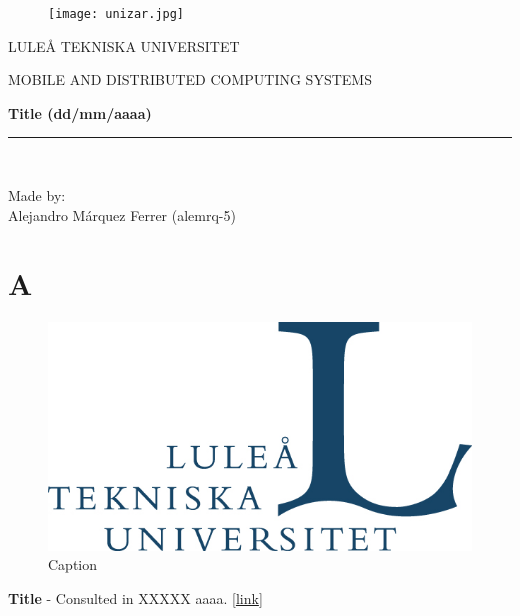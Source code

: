 \documentclass[a4paper]{article}
\begin{document}
\begin{titlepage}

\begin{center}
\vspace*{-1in}
\begin{figure}[htb]
\begin{center}
\texttt{[image: unizar.jpg]}
\end{center}
\end{figure}

\vspace*{0.3in}

LULEÅ TEKNISKA UNIVERSITET \\

\vspace*{0.3in}

\begin{large}
MOBILE AND DISTRIBUTED COMPUTING SYSTEMS\\
\end{large}
\vspace*{0.2in}
\begin{Large}
\textbf{Title (dd/mm/aaaa)} \\
\end{Large}
\vspace*{0.3in}
\begin{large}
\end{large}
\vspace*{0.5in}
\rule{80mm}{0.1mm}\\
\vspace*{0.1in}
\begin{large}
Made by: \\
Alejandro Márquez Ferrer (alemrq-5)\\

\end{large}
\end{center}

\end{titlepage}
\tableofcontents

\newpage
\section{A}
\begin{figure}[H]
	\centering
	\includegraphics[width=1\linewidth]{LTU.jpg}
	\caption{Caption}
	\label{fig:pf}
\end{figure}

\newpage
\begin{thebibliography}{99} 
 \textbf{Title} - Consulted in XXXXX aaaa. [\url{link}]

\end{thebibliography}
\end{document}
